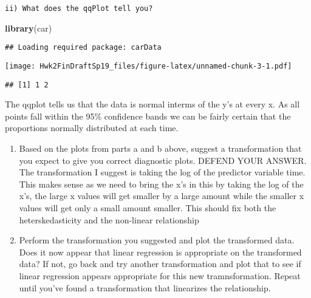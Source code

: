 \documentclass[12pt,]{article}
\newenvironment{Shaded}{\begin{snugshade}}{\end{snugshade}}
\newcommand{\KeywordTok}[1]{\textcolor[rgb]{0.13,0.29,0.53}{\textbf{#1}}}
\newcommand{\OperatorTok}[1]{\textcolor[rgb]{0.81,0.36,0.00}{\textbf{#1}}}
\newcommand{\NormalTok}[1]{#1}
\providecommand{\tightlist}{%
  \setlength{\itemsep}{0pt}\setlength{\parskip}{0pt}}
\begin{document}
\begin{verbatim}
ii) What does the qqPlot tell you?
\end{verbatim}

\begin{Shaded}
\begin{Highlighting}[]
\KeywordTok{library}\NormalTok{(car)}
\end{Highlighting}
\end{Shaded}

\begin{verbatim}
## Loading required package: carData
\end{verbatim}

\begin{Shaded}
\end{Shaded}

\texttt{[image: Hwk2FinDraftSp19\_files/figure-latex/unnamed-chunk-3-1.pdf]}

\begin{verbatim}
## [1] 1 2
\end{verbatim}

The qqplot tells us that the data is normal interms of the y's at every
x. As all points fall within the 95\% confidence bands we can be fairly
certain that the proportions normally distributed at each time.

\begin{enumerate}
\def\labelenumi{\alph{enumi})}
\setcounter{enumi}{2}
\tightlist
\item
  Based on the plots from parts a and b above, suggest a transformation
  that you expect to give you correct diagnostic plots. DEFEND YOUR
  ANSWER. The transformation I suggest is taking the log of the
  predictor variable time. This makes sense as we need to bring the x's
  in this by taking the log of the x's, the large x values will get
  smaller by a large amount while the smaller x values will get only a
  small amount smaller. This should fix both the heterskedasticity and
  the non-linear relationship
\item
  Perform the transformation you suggested and plot the transformed
  data. Does it now appear that linear regression is appropriate on the
  transformed data? If not, go back and try another transformation and
  plot that to see if linear regression appears appropriate for this new
  tramnsformation. Repeat until you've found a transformation that
  linearizes the relationship.
\end{enumerate}
\end{document}
